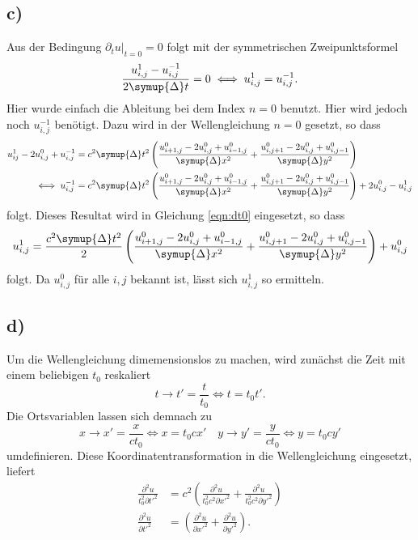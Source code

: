 \subsection*{c)}
Aus der Bedingung $\partial_t u\bigr |_{t=0} = 0$ folgt mit der symmetrischen Zweipunktsformel 
\begin{equation}
    \frac{u_{i,j}^1 - u_{i,j}^{-1}}{2\symup{\Delta}t } = 0 \iff u_{i,j}^1 = u_{i,j}^{-1}. \label{eqn:dt0}
\end{equation}
Hier wurde einfach die Ableitung bei dem Index $n=0$ benutzt.
Hier wird jedoch noch $u_{i,j}^{-1}$ benötigt.
Dazu wird in der Wellengleichung $n=0$ gesetzt, so dass 
\begin{align*}
    u_{ij}^{1} -2 u_{i,j}^{0} + u_{i,j}^{-1} &= c^2 \symup{\Delta} t^2 
    \left ( \frac{u_{i+1,j}^0 -2 u_{i,j}^0 + u_{i-1,j}^0 } {\symup{\Delta}x^2} 
    + \frac{u_{i,j+1}^0 -2 u_{i,j}^0 + u_{i,j-1}^0 } {\symup{\Delta}y^2} \right ) \\
    \iff u_{i,j}^{-1} &= c^2 \symup{\Delta} t^2 
    \left ( \frac{u_{i+1,j}^0 -2 u_{i,j}^0 + u_{i-1,j}^0 } {\symup{\Delta}x^2} 
    + \frac{u_{i,j+1}^0 -2 u_{i,j}^0 + u_{i,j-1}^0 } {\symup{\Delta}y^2} \right ) + 2 u_{i,j}^0 - u_{i,j}^1
\end{align*}
folgt.
Dieses Resultat wird in Gleichung \eqref{eqn:dt0} eingesetzt, so dass 
\begin{equation*}
    u_{i,j}^1 = \frac{c^2 \symup{\Delta} t^2}{2}
    \left ( \frac{u_{i+1,j}^0 -2 u_{i,j}^0 + u_{i-1,j}^0 } {\symup{\Delta}x^2} 
    + \frac{u_{i,j+1}^0 -2 u_{i,j}^0 + u_{i,j-1}^0 } {\symup{\Delta}y^2} \right ) + u_{i,j}^0
\end{equation*}
folgt.
Da $u_{i,j}^0$ für alle $i,j$ bekannt ist, lässt sich $u_{i,j}^1$ so ermitteln.
\subsection*{d)}
Um die Wellengleichung dimemensionslos zu machen, wird zunächst die Zeit mit einem beliebigen $t_0$ reskaliert
\begin{equation*}
    t \to t' = \frac{t}{t_0} \iff t = t_0 t'.
\end{equation*}
Die Ortsvariablen lassen sich demnach zu 
\begin{equation*}
    x \to x' = \frac{x}{c t_0} \iff x = t_0 c x' \quad y \to y' = \frac{y}{c t_0} \iff y = t_0 c y'
\end{equation*}
umdefinieren.
Diese Koordinatentransformation in die Wellengleichung eingesetzt, liefert 
\begin{align*}
    \frac{\partial^2 u }{t_0^2 \partial t'^2} &= c^2 \left ( \frac{\partial^2 u }{t_0^2 c^2 \partial x'^2} + \frac{\partial^2 u }{t_0^2 c^2  \partial y'^2}\right ) \\
    \frac{\partial^2 u }{\partial t'^2} &= \left ( \frac{\partial^2 u }{ \partial x'^2} + \frac{\partial^2 u }{\partial y'^2}\right ).
\end{align*}
